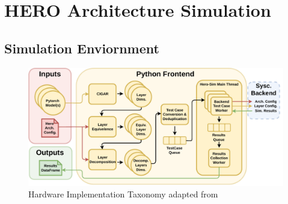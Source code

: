 
\chapter{HERO Architecture Simulation}
\label{chap:results}


\section{Simulation Enviornment}
\label{chap:hero:sim_platform}


\begin{figure}[ht]
    \centering
    \includegraphics[scale=0.58]{fig/hero-sim-frontend.pdf}
    \caption{Hardware Implementation Taxonomy adapted from \cite{maestro}}
    \label{fig:hw_taxonomy}
\end{figure}

